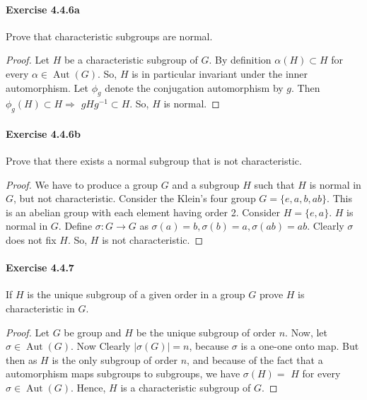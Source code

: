 \documentclass{article}
\theoremstyle{definition}
\begin{document}
\paragraph{Exercise 4.4.6a} Prove that characteristic subgroups are normal.
\begin{proof}
    Let $H$ be a characteristic subgroup of $G$. By definition $\alpha(H) \subset H$ for every $\alpha \in \operatorname{Aut}(G)$. So, $H$ is in particular invariant under the inner automorphism. Let $\phi_g$ denote the conjugation automorphism by $g$. Then $\phi_g(H) \subset H \Longrightarrow$ $g H g^{-1} \subset H$. So, $H$ is normal. 
\end{proof}



\paragraph{Exercise 4.4.6b} Prove that there exists a normal subgroup that is not characteristic.
\begin{proof}
    We have to produce a group $G$ and a subgroup $H$ such that $H$ is normal in $G$, but not characteristic. Consider the Klein's four group $G=\{ e, a, b, a b\}$. This is an abelian group with each element having order 2. Consider $H=\{ e, a\}$. $H$ is normal in $G$. Define $\sigma: G \rightarrow G$ as $\sigma(a)=b, \sigma(b)=a, \sigma(a b)=a b$. Clearly $\sigma$ does not fix $H$. So, $H$ is not characteristic.
\end{proof}



\paragraph{Exercise 4.4.7} If $H$ is the unique subgroup of a given order in a group $G$ prove $H$ is characteristic in $G$.
\begin{proof}
    Let $G$ be group and $H$ be the unique subgroup of order $n$. Now, let $\sigma \in \operatorname{Aut}(G)$. Now Clearly $|\sigma(G)|=n$, because $\sigma$ is a one-one onto map. But then as $H$ is the only subgroup of order $n$, and because of the fact that a automorphism maps subgroups to subgroups, we have $\sigma(H)=$ $H$ for every $\sigma \in \operatorname{Aut}(G)$. Hence, $H$ is a characteristic subgroup of $G$.
\end{proof}
\end{document}
